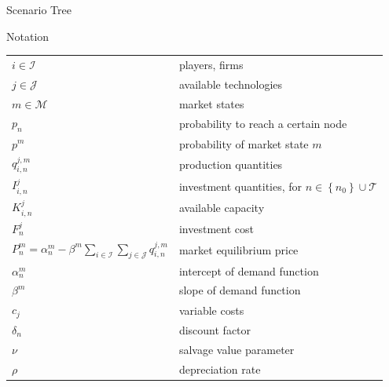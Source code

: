 \begin{frame}{Scenario Tree}
\begin{center}
{
\endpsmatrix}
\end{center}
\end{frame}


\begin{frame}{Notation}
  \begin{tabular}[l]{l l}
\centering
$i \in \mathcal{I}$ & players, firms \\
$j \in \mathcal{J}$ & available technologies \\
$m\in\mathcal{M}$ & market states \\
$p_n$ & probability to reach a certain node\\
$p^m$ & probability of market state $m$ \\
$ q_{i,n}^{j,m}$ & production quantities \\
$I_{i,n}^{j}$ & investment quantities, for $n\in\left\{n_0\right\}\cup\mathcal{T}$ \\
$K_{i,n}^{j}$ & available capacity\\
$F_n^{j}$ & investment cost\\
$P^m_n = \alpha_n^m-\beta^m\sum_{i\in \mathcal{I}}\sum_{j\in \mathcal{J}}q_{i,n}^{j,m}$ & market equilibrium price \\
$\alpha_n^m$ & intercept of demand function \\
$\beta^m$ & slope of demand function \\
$c_j$ & variable costs \\
$\delta_n$ & discount factor \\
$\nu$ & salvage value parameter\\
$\rho$ & depreciation rate\\
\end{tabular}
\end{frame}

